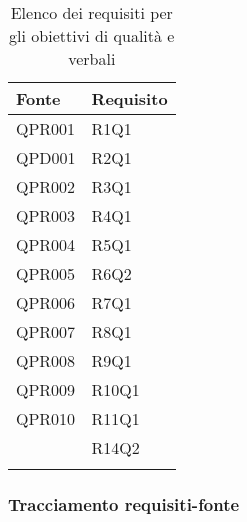 		\begin{table}[H]
		\centering
		{\def\arraystretch{1.5}
		\begin{tabularx}{\textwidth}{YY}
			\textbf{Fonte} & \textbf{Requisito} \\
			\toprule
			QPR001 & R1Q1 \\
			QPD001 & R2Q1 \\
			QPR002 & R3Q1 \\
			QPR003 & R4Q1 \\
			QPR004 & R5Q1 \\
			QPR005 & R6Q2 \\
			QPR006 & R7Q1 \\
			QPR007 & R8Q1 \\
			QPR008 & R9Q1 \\
			QPR009 & R10Q1 \\
			QPR010 & R11Q1 \\
			 & R14Q2 \\
			\bottomrule\\
		\end{tabularx}}
		\caption{Elenco dei requisiti per gli obiettivi di qualità e verbali}
	\end{table}

\newcommand{\deV}{\addtocounter{V}{+1}} %
\newcommand{\addC}[0]{\theV \deV} %
\addtocounter{V}{1}

\newcommand{\deVv}{\addtocounter{Vv}{+1}} %
\newcommand{\addVC}[0]{\theVv \deVv} %
\addtocounter{Vv}{1}

\newcommand{\deX}{\addtocounter{X}{+1}} %
\newcommand{\addX}[0]{\theX \deX} %
\addtocounter{X}{1}

		\subsubsection{Tracciamento requisiti-fonte}

